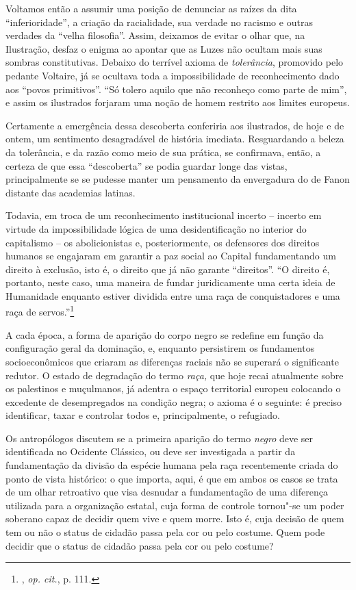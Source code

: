 Voltamos então a assumir uma
posição de denunciar as raízes da dita ``inferioridade'', a criação da
racialidade, sua verdade no racismo e outras verdades da ``velha
filosofia''. Assim, deixamos de evitar o olhar que, na Ilustração,
desfaz o enigma ao apontar que as Luzes não ocultam mais suas sombras
constitutivas. Debaixo do terrível axioma de \emph{tolerância},
promovido pelo pedante Voltaire, já se ocultava toda a impossibilidade
de reconhecimento dado aos ``povos primitivos''. ``Só tolero aquilo que
não reconheço como parte de mim'', e assim os ilustrados forjaram uma
noção de homem restrito aos limites europeus.

Certamente a emergência dessa descoberta conferiria aos ilustrados, de
hoje e de ontem, um sentimento desagradável de história imediata.
Resguardando a beleza da tolerância, e da razão como meio de sua
prática, se confirmava, então, a certeza de que essa ``descoberta'' se
podia guardar longe das vistas, principalmente se se pudesse manter um
pensamento da envergadura do de Fanon distante das academias latinas.

Todavia, em troca de um reconhecimento institucional incerto -- incerto
em virtude da impossibilidade lógica de uma desidentificação no interior
do capitalismo -- os abolicionistas e, posteriormente, os defensores dos
direitos humanos se engajaram em garantir a paz social ao Capital
fundamentando um direito à exclusão, isto é, o direito que já não
garante ``direitos''. ``O direito é, portanto, neste caso, uma maneira
de fundar juridicamente uma certa ideia de Humanidade enquanto estiver
dividida entre uma raça de conquistadores e uma raça de
servos.''\footnote{, \emph{op. cit.}, p. 111.}

A cada época, a forma de aparição do corpo negro se redefine em função
da configuração geral da dominação, e, enquanto persistirem os
fundamentos socioeconômicos que criaram as diferenças raciais não se
superará o significante redutor. O estado de degradação do termo
\emph{raça,} que hoje recai atualmente sobre os palestinos e muçulmanos,
já adentra o espaço territorial europeu colocando o excedente de
desempregados na condição negra; o axioma é o seguinte: é preciso
identificar, taxar e controlar todos e, principalmente, o refugiado.

Os antropólogos discutem se a primeira aparição do termo \emph{negro}
deve ser identificada no Ocidente Clássico, ou deve ser investigada a
partir da fundamentação da divisão da espécie humana pela raça
recentemente criada do ponto de vista histórico: o que importa, aqui, é
que em ambos os casos se trata de um olhar retroativo que visa desnudar
a fundamentação de uma diferença utilizada para a organização estatal,
cuja forma de controle tornou"-se um poder soberano capaz de decidir quem
vive e quem morre. Isto é, cuja decisão de quem tem ou não o status de
cidadão passa pela cor ou pelo costume. Quem pode decidir que o status
de cidadão passa pela cor ou pelo costume?

